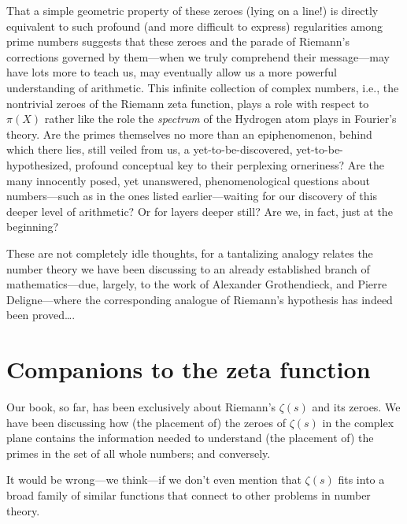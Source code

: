 \documentclass[openany]{book}
\theoremstyle{plain}
\theoremstyle{definition}
\begin{document}
{{That a simple geometric property of these zeroes (lying on a line!) is
directly equivalent to such profound (and more difficult to express)
regularities among prime numbers suggests that these zeroes and the
parade of Riemann's corrections governed by them---when we truly
comprehend their message---may have lots more to teach us, may
eventually allow us a more powerful understanding of arithmetic.  This
infinite collection of complex numbers, i.e., the nontrivial zeroes of
the Riemann zeta function, plays a role with respect to $\pi(X)$ rather
like the role the {\em spectrum} of the Hydrogen atom plays in
Fourier's theory.  Are the primes themselves no more than an
epiphenomenon, behind which there lies, still veiled from us, a
yet-to-be-discovered, yet-to-be-hypothesized, profound conceptual key
to their perplexing orneriness?  Are the many innocently posed, yet
unanswered, phenomenological questions about numbers---such as in the
ones listed earlier---waiting for our discovery of this deeper level
of arithmetic?  Or for layers deeper still?  Are we, in fact, just at
the beginning?




These are not completely idle thoughts, for a tantalizing analogy
relates the number theory we have been discussing to an already
established branch of mathematics---due, largely, to the work of
Alexander Grothendieck, and Pierre Deligne---where the corresponding
analogue of Riemann's hypothesis has indeed been proved\ldots.



\chapter{Companions to the zeta function}\label{ch:companions}

Our book, so far, has been exclusively about Riemann's $\zeta(s)$ and
its zeroes. We have been discussing how (the placement of) the zeroes
of $\zeta(s)$ in the complex plane contains the information needed to
understand (the placement of) the primes in the set of all whole
numbers; and conversely.

It would be wrong---we think---if we don't even mention that
$\zeta(s)$ fits into a broad family of similar functions that connect to other problems in number theory.



}}
\end{document}
